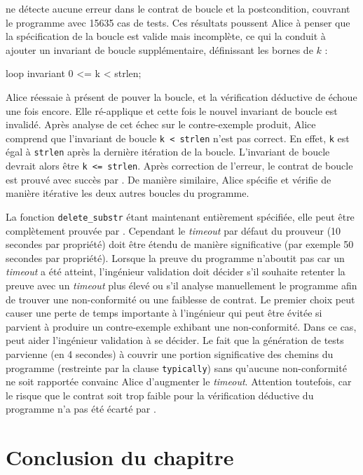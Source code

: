 \NCD ne détecte aucune erreur dans le contrat de boucle et la postcondition,
couvrant le programme avec 15635 cas de tests.
Ces résultats poussent Alice à penser que la spécification de la boucle est
valide mais incomplète, ce qui la conduit à ajouter un invariant de boucle
supplémentaire, définissant les bornes de $k$ : 

\begin{pretty-codeACSL} 
loop invariant 0 <= k < strlen;
\end{pretty-codeACSL} 

Alice réessaie à présent de pouver la boucle, et la vérification déductive de
\Wp échoue une fois encore.
Elle ré-applique \NCD et cette fois le nouvel invariant de boucle est invalidé.
Après analyse de cet échec sur le contre-exemple produit, Alice comprend que
l'invariant de boucle \lstinline{k < strlen} n'est pas correct.
En effet, \lstinline{k} est égal à \lstinline{strlen} après la dernière
itération de la boucle.
L'invariant de boucle devrait alors être \lstinline{k <= strlen}.
Après correction de l'erreur, le contrat de boucle est prouvé avec succès par
\Wp.
De manière similaire, Alice spécifie et vérifie de manière itérative les deux
autres boucles du programme.

La fonction \lstinline{delete_substr} étant maintenant entièrement spécifiée,
elle peut être complètement prouvée par \Wp.
Cependant le {\em timeout} par défaut du prouveur (10 secondes par propriété)
doit être étendu de manière significative (par exemple 50 secondes par
propriété).
Lorsque la preuve du programme n'aboutit pas car un {\em timeout} a été atteint,
l'ingénieur validation doit décider s'il souhaite retenter la preuve avec
un {\em timeout} plus élevé ou s'il analyse manuellement le programme afin de
trouver une non-conformité ou une faiblesse de contrat.
Le premier choix peut causer une perte de temps importante à l'ingénieur qui
peut être évitée si \NCD parvient à produire un contre-exemple exhibant une
non-conformité.
Dans ce cas, \NCD peut aider l'ingénieur validation à se décider.
Le fait que la génération de tests parvienne (en 4 secondes) à couvrir une
portion significative des chemins du programme (restreinte par la clause
\lstinline'typically') sans qu'aucune non-conformité ne soit rapportée convainc
Alice d'augmenter le {\em timeout}.
Attention toutefois, car le risque que le contrat soit trop faible pour la
vérification déductive du programme n'a pas été écarté par \NCD.


\section*{Conclusion du chapitre}


